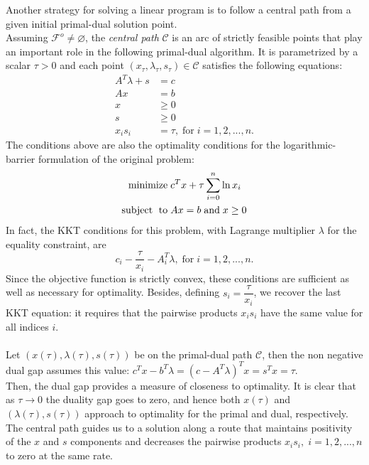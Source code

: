 \documentclass[a4paper,10 pt,titlepage,twoside]{book}
\theoremstyle{plain}
\theoremstyle{definition}
\theoremstyle{remark}
\begin{document}
Another strategy for solving a linear program is to follow a central path from a given initial primal-dual solution point.\\ Assuming $\mathcal{F}^{o}\neq \varnothing$, the \textit{central path} $\mathcal{C}$ is an arc of strictly feasible points that play an important role in the following primal-dual algorithm. It is parametrized by a scalar $\tau  > 0$ and each point $(x_{\tau}, \lambda_{\tau}, s_{\tau})\in \mathcal{C}$ satisfies the following equations:
\begin{align}
A^{T}\lambda+s&=c\\
Ax&=b\\
x&\geq 0\\
s&\geq 0\\
x_{i}s_{i}&= \tau,\; \text{for}\;i= 1,2,...,n.\label{(Tao)}
\end{align} 
The conditions above are also the optimality conditions for the logarithmic-barrier formulation of the original problem:
\begin{equation}
\begin{split}
\text{minimize\;} &c^{T}x + \tau\sum_{i=0}^{n}\ln{x_{i}}\\
\text{subject\; to\;}&Ax = b\;\text{and\;} x\geq0
\end{split}
\end{equation}
In fact, the KKT conditions for this problem, with Lagrange multiplier $\lambda$ for the equality constraint, are
\begin{equation*}
c_{i} - \dfrac{\tau}{x_{i}} - A^{T}_{i}\lambda,\; \text{for}\;i = 1,2,...,n.
\end{equation*}  
Since the objective function is strictly convex, these conditions are sufficient as well as necessary for optimality. Besides, defining $s_{i} = \dfrac{\tau}{x_{i}}$, we recover the last KKT equation: it requires that the pairwise products $x_{i}s_{i}$ have the same value for all indices $i$.
\\
\\
Let $(x(\tau), \lambda(\tau), s(\tau))$ be on the primal-dual path $\mathcal{C}$, then the non negative dual gap assumes this value: $c^{T}x-b^{T}\lambda=\left(c-A^{T}\lambda\right)^{T}x=s^{T}x=\tau$.\\
Then, the dual gap provides a measure of closeness to optimality. It is clear that as $\tau\to0$ the duality gap goes to zero, and hence both $x(\tau)$ and
 $(\lambda(\tau), s(\tau))$ approach to optimality for the primal and dual, respectively. The central path guides us to a solution along a route that maintains positivity of the $x$ and $s$ components and decreases the pairwise products $x_{i}s_{i},\;i = 1,2,...,n$ to zero at the same rate.\\
\end{document}
